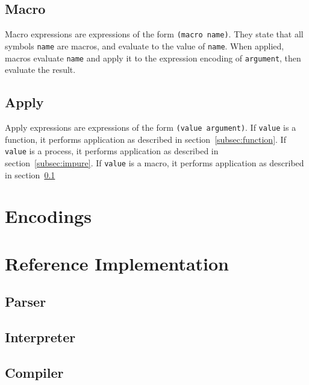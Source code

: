\documentclass{article}
\begin{document}
\begin{multicols}{2}
        \subsection{Macro}\label{subsec:macro}

        Macro expressions are expressions of the form \lstinline$(macro name)$.
        They state that all symbols \lstinline$name$ are macros, and evaluate to the value of \lstinline$name$.
        When applied, macros evaluate \lstinline$name$ and apply it to the expression encoding of \lstinline$argument$, then evaluate the result.
        \newline

        \subsection{Apply}\label{subsec:apply}

        Apply expressions are expressions of the form \lstinline$(value argument)$.
        If \lstinline$value$ is a function, it performs application as described in section~\ref{subsec:function}.
        If \lstinline$value$ is a process, it performs application as described in section~\ref{subsec:impure}.
        If \lstinline$value$ is a macro, it performs application as described in section~\ref{subsec:macro}
        \newline
    \end{multicols}
    \newpage

    \section{Encodings}\label{sec:encodings}

    \begin{multicols*}{2}
        
    \end{multicols*}
    \newpage

    \section{Reference Implementation}\label{sec:implementation}

    \subsection{Parser}\label{subsec:parser}

    

    \subsection{Interpreter}\label{subsec:interpreter}

    

    \subsection{Compiler}\label{subsec:compiler}

    
\end{document}
